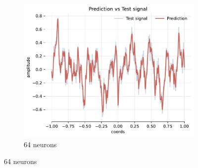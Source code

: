 \begin{figure}[!h]
    \begin{subfigure}[b]{0.32\textwidth}
        \centering
        \includegraphics[width=\textwidth]{img/ch4/pred-noise-1hl-64hf-w8.pdf}
        \caption{64 neurons}
        \label{fig:pred-noise-1hl-64hf-w8}
    \end{subfigure}


\end{figure}
